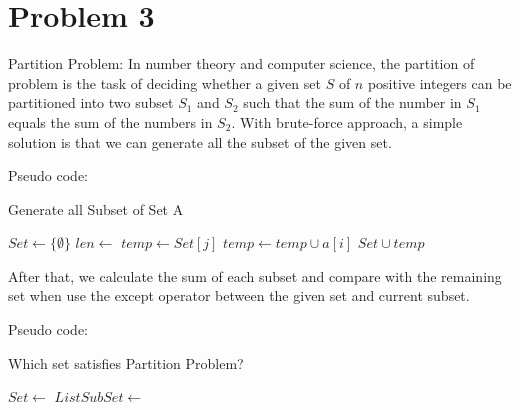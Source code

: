 \documentclass[a4paper]{article}
\begin{document}
\section{Problem 3}
Partition Problem: In number theory and computer science, the partition of problem is the task of deciding whether a given set $S$ of $n$ positive integers can be partitioned into two subset $S_1$ and $S_2$ such that the sum of the number in $S_1$ equals the sum of the numbers in $S_2$. With brute-force approach, a simple solution is that we can generate all the subset of the given set. \par
Pseudo code: \par
\begin{algorithm}
\renewcommand{\thealgorithm}{1}
\caption{Generate all Subset of Set A}
\begin{algorithmic}[1]
    \State $Set \gets \{\emptyset\}$   
        \State $len \gets$ 
            \State $temp \gets Set[j]$
            \State $temp \gets temp \cup a[i] $
            \State $Set \cup temp$
        \EndFor
    \EndFor
    \State {}
\EndProcedure
\end{algorithmic}
\end{algorithm}
After that, we calculate the sum of each subset and compare with the remaining set when use the except operator between the given set and current subset. \par
Pseudo code: \par
\begin{algorithm}
\renewcommand{\thealgorithm}{2}
\caption{Which set satisfies Partition Problem?}
\begin{algorithmic}
    \State $Set \gets$ 
    \State $ListSubSet \gets$ 
        \State {}
        \EndIf
    \EndFor
    \State {}
\EndProcedure
\end{algorithmic}
\end{algorithm}
\end{document}
